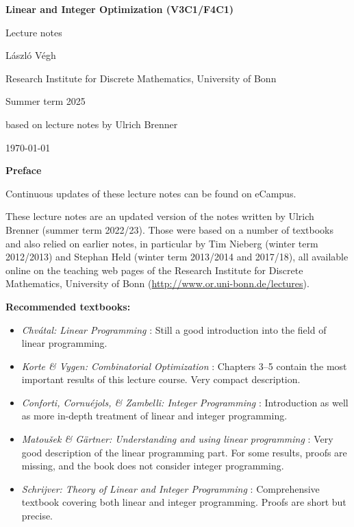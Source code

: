\documentclass[12pt, showidx, twoside]{article}
\def\newpage{\par\vfill\eject}
\begin{document}
\begin{center}
{\LARGE \bf Linear and Integer Optimization (V3C1/F4C1)}

\vspace*{2cm}

{\Large

Lecture notes

\vspace*{2cm}

L\'aszl\'o V\'egh

Research Institute for Discrete Mathematics, University of Bonn

Summer term 2025

based on lecture notes by Ulrich Brenner

\today 

}

\end{center}

\newpage
\thispagestyle{empty}
\enlargethispage{4\baselineskip}
\tableofcontents


\newpage

{\Large \bf Preface}


Continuous updates of these lecture notes can be found on eCampus.

These lecture notes are an updated version of the notes written by Ulrich Brenner (summer term 2022/23). 
Those were based on a number of textbooks and also relied on earlier notes, in particular by Tim Nieberg (winter term 2012/2013) and Stephan Held
(winter term 2013/2014 and 2017/18), all available online on the
teaching web pages of the Research Institute for Discrete Mathematics,
University of Bonn 
(\href{http://www.or.uni-bonn.de/lectures}{http://www.or.uni-bonn.de/lectures}).

{\bf Recommended textbooks:}
\begin{itemize}
   \item {\em Chv{\'a}tal: Linear Programming} \cite{Chv83}: Still a good introduction into the field 
      of linear programming.
   \item {\em Korte \& Vygen: Combinatorial Optimization} \cite{KorV18}: Chapters 3--5 contain the most important 
      results of this lecture course. Very compact description.
\item {\em Conforti,  Cornu{\'e}jols, \&  Zambelli: Integer Programming} \cite{CCZ14}: Introduction as well as more in-depth treatment of linear and integer programming.
   \item {\em Matou{\v{s}}ek \& G{\"a}rtner: Understanding and using linear programming} \cite{MatG07}: Very good description of the linear programming
      part. 
      For some results, proofs are missing, and the book does not consider 
      integer programming.
   \item {\em Schrijver: Theory of Linear and Integer Programming} \cite{Sch86}: Comprehensive textbook covering both linear and
      integer programming. Proofs are short but precise.
\end{itemize}
\end{document}
